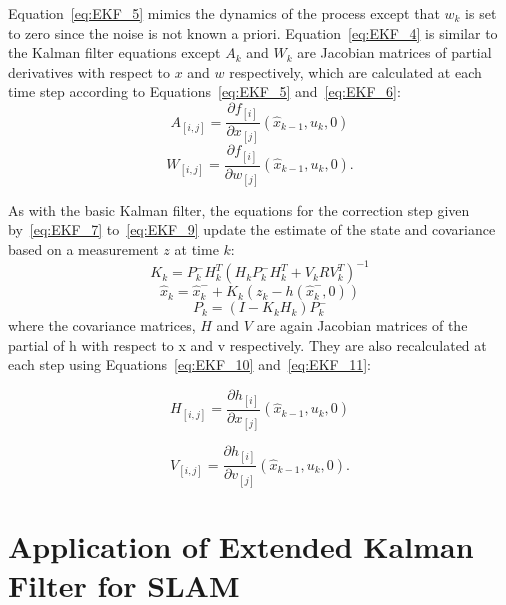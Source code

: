 Equation~\ref{eq:EKF_5} mimics the dynamics of the process except that $ w_k $ is set to zero since the noise is not known a priori. Equation~\ref{eq:EKF_4} is similar to the Kalman filter equations except $ A_k $ and $ W_k $ are Jacobian matrices of partial derivatives with respect to $ x $ and $ w $ respectively, which are calculated at each time step according to Equations~\ref{eq:EKF_5} and~\ref{eq:EKF_6}:
\begin{equation}
\label{eq:EKF_5}
A_{[i,j]} = \frac{\partial f_{[i]}}{\partial x_{[j]}} (\hat{x}_{k-1},u_k,0)
\end{equation}
\begin{equation}
\label{eq:EKF_6}
W_{[i,j]} = \frac{\partial f_{[i]}}{\partial w_{[j]}} (\hat{x}_{k-1},u_k,0).
\end{equation}

As with the basic Kalman filter, the equations for the correction step given by~\ref{eq:EKF_7} to~\ref{eq:EKF_9} update the estimate of the state and covariance based on a measurement $ z $ at time $ k $:
\begin{equation}
\label{eq:EKF_7}
K_k = P^-_kH^T_k(H_kP^-_kH^T_k+V_kRV^T_k)^{-1}
\end{equation}
\begin{equation}
\label{eq:EKF_8}
\hat{x}_k = \hat{x}^-_k+K_k(z_k-h(\hat{x}^-_k,0))
\end{equation}
\begin{equation}
\label{eq:EKF_9}
P_k = (I-K_kH_k)P^-_k
\end{equation} 
where the covariance matrices, $ H $ and $ V $ are again Jacobian matrices of the partial of h with respect to x and v respectively. They are also recalculated at each step using Equations~\ref{eq:EKF_10} and~\ref{eq:EKF_11}:

\begin{equation}
\label{eq:EKF_10}
H_{[i,j]} = \frac{\partial h_{[i]}}{\partial x_{[j]}} (\hat{x}_{k-1},u_k,0)
\end{equation}

\begin{equation}
\label{eq:EKF_11}
V_{[i,j]} = \frac{\partial h_{[i]}}{\partial v_{[j]}} (\hat{x}_{k-1},u_k,0).
\end{equation}

\section{Application of Extended Kalman Filter for SLAM}
\label{sec:EKF_SLAM}

